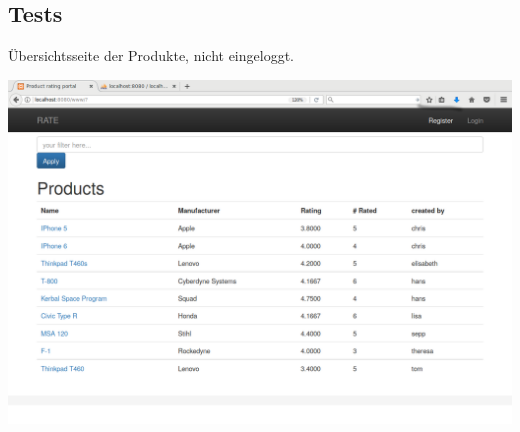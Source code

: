 \documentclass{article}
\begin{document}































\subsection{Tests}


Übersichtsseite der Produkte, nicht eingeloggt.

\includegraphics[width=1.0\textwidth]{1.png}
\end{document}

